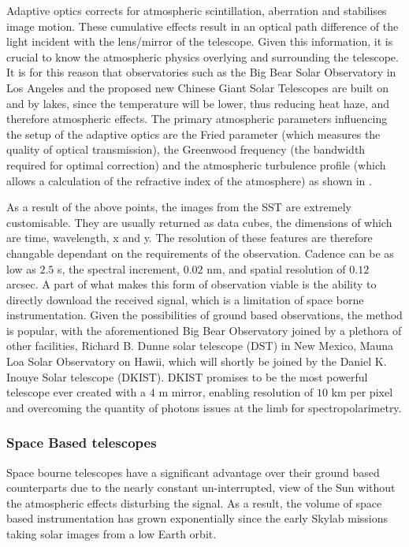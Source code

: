 Adaptive optics corrects for atmospheric scintillation, aberration and stabilises image motion.
These cumulative effects result in an optical path difference of the light incident with the lens/mirror of the telescope.
Given this information, it is crucial to know the atmospheric physics overlying and surrounding the telescope.
It is for this reason that observatories such as the Big Bear Solar Observatory \citep{Cao2010} in Los Angeles and the proposed new Chinese Giant Solar Telescopes \citep{Liu2014} are built on and by lakes, since the temperature will be lower, thus reducing heat haze, and therefore atmospheric effects.
The primary atmospheric parameters influencing the setup of the adaptive optics are the Fried parameter (which measures the quality of optical transmission), the Greenwood frequency (the bandwidth required for optimal correction) and the atmospheric turbulence profile (which allows a calculation of the refractive index of the atmosphere) as shown in \cite{Rimmele2011}.

As a result of the above points, the images from the SST are extremely customisable.
They are usually returned as data cubes, the dimensions of which are time, wavelength, x and y.
The resolution of these features are therefore changable dependant on the requirements of the observation.
Cadence can be as low as $2.5$ s, the spectral increment, $0.02$ nm, and spatial resolution of $0.12$ arcsec.
A part of what makes this form of observation viable is the ability to directly download the received signal, which is a limitation of space borne instrumentation.
Given the possibilities of ground based observations, the method is popular, with the aforementioned Big Bear Observatory joined by a plethora of other facilities, Richard B. Dunne solar telescope (DST) in New Mexico, Mauna Loa Solar Observatory on Hawii, which will shortly be joined by the Daniel K. Inouye Solar telescope (DKIST).
DKIST promises to be the most powerful telescope ever created with a $4$ m mirror, enabling resolution of $10$ km per pixel and overcoming the quantity of photons issues at the limb for spectropolarimetry.



\subsubsection{Space Based telescopes}

Space bourne telescopes have a significant advantage over their ground based counterparts due to the nearly constant un-interrupted, view of the Sun without the atmospheric effects disturbing the signal.
As a result, the volume of space based instrumentation has grown exponentially since the early Skylab missions taking solar images from a low Earth orbit.

